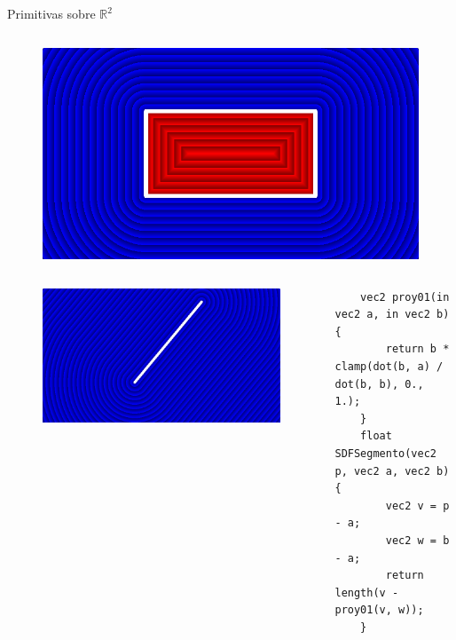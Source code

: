 \begin{frame}[fragile]{Primitivas sobre \(\mathbb{R}^2\)}
\begin{columns}[c, onlytextwidth]
        \column{1.5in}
            \begin{figure}[H]
              \centering
              \includegraphics[width=1.0\textwidth]{imagenes/sdf/2d/sdf_rectangulo.png}
            \end{figure}
        
    \end{columns}
    
    \begin{columns}[c, onlytextwidth]
        \column{1.5in}
            \begin{figure}[H]
              \centering
              \includegraphics[width=1.0\textwidth]{imagenes/sdf/2d/sdf_segmento.png}
            \end{figure}
        
        \column{\dimexpr\paperwidth-10pt}
            \begin{lstlisting}
    vec2 proy01(in vec2 a, in vec2 b){
        return b * clamp(dot(b, a) / dot(b, b), 0., 1.);
    }
    float SDFSegmento(vec2 p, vec2 a, vec2 b){
        vec2 v = p - a;
        vec2 w = b - a;
        return length(v -  proy01(v, w));
    }
            \end{lstlisting}
        
    \end{columns}

\end{frame}

